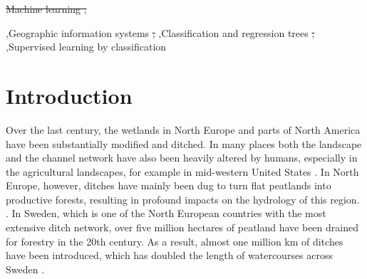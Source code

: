 \documentclass[11pt, review]{elsarticle} %
\providecommand{\DIFaddtex}[1]{{\protect\color{blue}\uwave{#1}}} %
\providecommand{\DIFdeltex}[1]{{\protect\color{red}\sout{#1}}}                      %
\providecommand{\DIFaddbegin}{} %
\providecommand{\DIFaddend}{} %
\providecommand{\DIFdelbegin}{} %
\providecommand{\DIFdelend}{} %
\providecommand{\DIFadd}[1]{\texorpdfstring{\DIFaddtex{#1}}{#1}} %
\providecommand{\DIFdel}[1]{\texorpdfstring{\DIFdeltex{#1}}{}} %
\begin{document}
\begin{frontmatter}
\DIFdelbegin %
\DIFdel{Machine learning ; }\DIFdelend \DIFaddbegin \begin{keyword}
{\footnotesize
\DIFadd{Machine learning }\sep \DIFaddend Geographic information systems \DIFdelbegin \DIFdel{; }\DIFdelend \DIFaddbegin \sep \DIFaddend Classification and regression trees \DIFdelbegin \DIFdel{; }\DIFdelend \DIFaddbegin \sep \DIFaddend Supervised learning by classification\DIFdelbegin %
\DIFdelend \DIFaddbegin }
\end{keyword}
\DIFaddend 

\DIFaddbegin \end{frontmatter}

\newpage
\DIFaddend \section{Introduction}\label{introduction}

Over the last century, the wetlands in North Europe and parts of North America have been substantially modified and ditched. In many places both the landscape and the channel network have also been heavily altered  by humans, especially in the agricultural landscapes, for example in mid-western United States \citep{passalacqua}. In North Europe, however, ditches have mainly been dug to turn flat peatlands into productive forests, resulting in profound impacts on the hydrology of this region. \citep{peatlands}. In Sweden, which is one of the North European countries with the most extensive ditch network, over five million hectares of peatland have been drained for forestry in the 20th century.  As a result, almost one million km of ditches have been introduced, which has doubled the length of watercourses across Sweden  \citep{hasselquist}.
\end{document}
